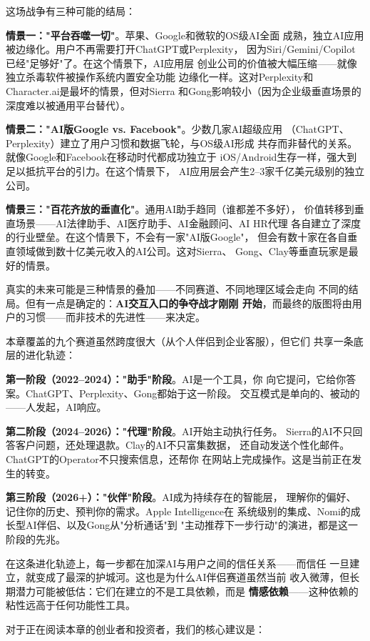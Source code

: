 这场战争有三种可能的结局：

\textbf{情景一："平台吞噬一切"}。苹果、Google和微软的OS级AI全面
成熟，独立AI应用被边缘化。用户不再需要打开ChatGPT或Perplexity，
因为Siri/Gemini/Copilot已经"足够好"了。在这个情景下，AI应用层
创业公司的价值被大幅压缩——就像独立杀毒软件被操作系统内置安全功能
边缘化一样。这对Perplexity和Character.ai是最坏的情景，但对Sierra
和Gong影响较小（因为企业级垂直场景的深度难以被通用平台替代）。

\textbf{情景二："AI版Google vs. Facebook"}。少数几家AI超级应用
（ChatGPT、Perplexity）建立了用户习惯和数据飞轮，与OS级AI形成
共存而非替代的关系。就像Google和Facebook在移动时代都成功独立于
iOS/Android生存一样，强大到足以抵抗平台的引力。在这个情景下，
AI应用层会产生2--3家千亿美元级别的独立公司。

\textbf{情景三："百花齐放的垂直化"}。通用AI助手趋同（谁都差不多好），
价值转移到垂直场景——AI法律助手、AI医疗助手、AI金融顾问、AI HR代理
各自建立了深度的行业壁垒。在这个情景下，不会有一家"AI版Google"，
但会有数十家在各自垂直领域做到数十亿美元收入的AI公司。这对Sierra、
Gong、Clay等垂直玩家是最好的情景。

真实的未来可能是三种情景的叠加——不同赛道、不同地理区域会走向
不同的结局。但有一点是确定的：\textbf{AI交互入口的争夺战才刚刚
开始}，而最终的版图将由用户的习惯——而非技术的先进性——来决定。

本章覆盖的九个赛道虽然跨度很大（从个人伴侣到企业客服），但它们
共享一条底层的进化轨迹：

\textbf{第一阶段（2022--2024）："助手"阶段}。AI是一个工具，你
向它提问，它给你答案。ChatGPT、Perplexity、Gong都始于这一阶段。
交互模式是单向的、被动的——人发起，AI响应。

\textbf{第二阶段（2024--2026）："代理"阶段}。AI开始主动执行任务。
Sierra的AI不只回答客户问题，还处理退款。Clay的AI不只富集数据，
还自动发送个性化邮件。ChatGPT的Operator不只搜索信息，还帮你
在网站上完成操作。这是当前正在发生的转变。

\textbf{第三阶段（2026+）："伙伴"阶段}。AI成为持续存在的智能层，
理解你的偏好、记住你的历史、预判你的需求。Apple Intelligence在
系统级别的集成、Nomi的成长型AI伴侣、以及Gong从"分析通话"到
"主动推荐下一步行动"的演进，都是这一阶段的先兆。

在这条进化轨迹上，每一步都在加深AI与用户之间的信任关系——而信任
一旦建立，就变成了最深的护城河。这也是为什么AI伴侣赛道虽然当前
收入微薄，但长期潜力可能被低估：它们在建立的不是工具依赖，而是
\textbf{情感依赖}——这种依赖的粘性远高于任何功能性工具。

对于正在阅读本章的创业者和投资者，我们的核心建议是：

